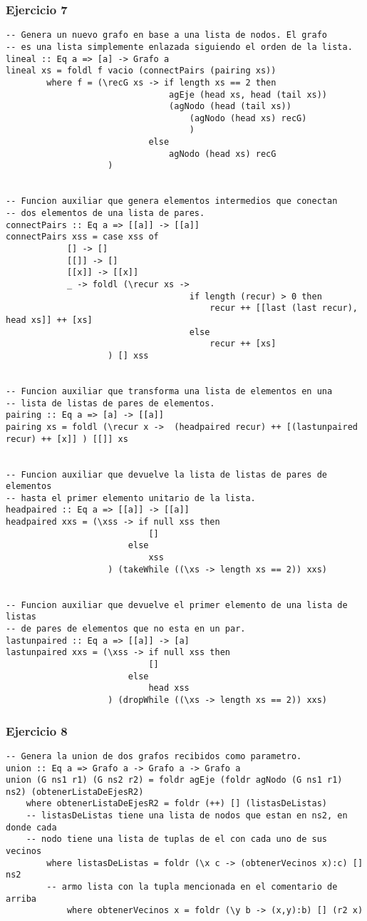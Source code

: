 \subsubsection*{Ejercicio 7}
\begin{lstlisting}
-- Genera un nuevo grafo en base a una lista de nodos. El grafo
-- es una lista simplemente enlazada siguiendo el orden de la lista.
lineal :: Eq a => [a] -> Grafo a
lineal xs = foldl f vacio (connectPairs (pairing xs))
		where f = (\recG xs -> if length xs == 2 then
								agEje (head xs, head (tail xs)) 
								(agNodo (head (tail xs)) 
									(agNodo (head xs) recG)
									)
							else 
								agNodo (head xs) recG
					)
					

-- Funcion auxiliar que genera elementos intermedios que conectan
-- dos elementos de una lista de pares.
connectPairs :: Eq a => [[a]] -> [[a]]
connectPairs xss = case xss of 
			[] -> []
			[[]] -> []
			[[x]] -> [[x]]
			_ -> foldl (\recur xs -> 
									if length (recur) > 0 then
										recur ++ [[last (last recur), head xs]] ++ [xs]
									else
										recur ++ [xs]
					) [] xss
					
					
-- Funcion auxiliar que transforma una lista de elementos en una
-- lista de listas de pares de elementos.
pairing :: Eq a => [a] -> [[a]]
pairing xs = foldl (\recur x ->  (headpaired recur) ++ [(lastunpaired recur) ++ [x]] ) [[]] xs


-- Funcion auxiliar que devuelve la lista de listas de pares de elementos
-- hasta el primer elemento unitario de la lista.
headpaired :: Eq a => [[a]] -> [[a]]
headpaired xxs = (\xss -> if null xss then 
							[] 
						else 
							xss
					) (takeWhile ((\xs -> length xs == 2)) xxs) 
						
						
-- Funcion auxiliar que devuelve el primer elemento de una lista de listas
-- de pares de elementos que no esta en un par.
lastunpaired :: Eq a => [[a]] -> [a]
lastunpaired xxs = (\xss -> if null xss then 
							[] 
						else 
							head xss
					) (dropWhile ((\xs -> length xs == 2)) xxs) 

\end{lstlisting}
\vspace{1cm}

\subsubsection*{Ejercicio 8}
\begin{lstlisting}
-- Genera la union de dos grafos recibidos como parametro. 
union :: Eq a => Grafo a -> Grafo a -> Grafo a
union (G ns1 r1) (G ns2 r2) = foldr agEje (foldr agNodo (G ns1 r1) ns2) (obtenerListaDeEjesR2) 
	where obtenerListaDeEjesR2 = foldr (++) [] (listasDeListas)
	-- listasDeListas tiene una lista de nodos que estan en ns2, en donde cada 
	-- nodo tiene una lista de tuplas de el con cada uno de sus vecinos 
		where listasDeListas = foldr (\x c -> (obtenerVecinos x):c) [] ns2 
		-- armo lista con la tupla mencionada en el comentario de arriba
			where obtenerVecinos x = foldr (\y b -> (x,y):b) [] (r2 x) 
\end{lstlisting}
\vspace{1cm}

